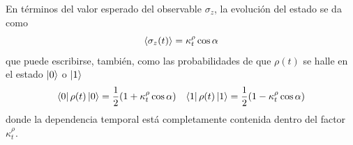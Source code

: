 En términos del valor esperado del observable $\sigma_{z}$, la evolución del estado se da como
\begin{equation}
  \expval{\sigma_{z}(t)}=\kappa_{t}^{\rho}\cos{\alpha}
\end{equation}
que puede escribirse, también, como las probabilidades de que $\rho(t)$ se halle en el estado $\ket{0}$ o $\ket{1}$
 \begin{align}
  \bra{0}\rho(t)\ket{0}=\frac{1}{2}(1+\kappa_{t}^{\rho}\cos{\alpha}) && \bra{1}\rho(t)\ket{1}=\frac{1}{2}(1-\kappa_{t}^{\rho}\cos{\alpha})
 \end{align}
 donde la dependencia temporal está completamente contenida dentro del factor $\kappa_{t}^{\rho}$. 
\newpage